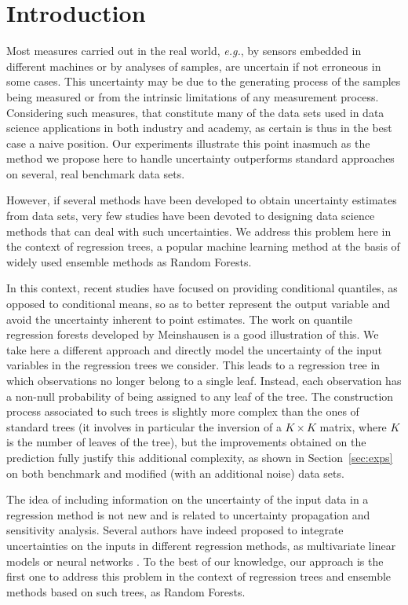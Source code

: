 \documentclass[twoside,11pt]{article}
\begin{document}
\section{Introduction}

Most measures carried out in the real world, \textit{e.g.}, by sensors embedded in different machines or by analyses of samples, are uncertain if not erroneous in some cases. This uncertainty may be due to the generating process of the samples being measured or from the intrinsic limitations of any measurement process. Considering such measures, that constitute many of the data sets used in data science applications in both industry and academy, as certain is thus in the best case a naive position. Our experiments illustrate this point inasmuch as the method we propose here to handle uncertainty outperforms standard approaches on several, real benchmark data sets.

However, if several methods have been developed to obtain uncertainty estimates from data sets, very few studies have been devoted to designing data science methods that can deal with such uncertainties. We address this problem here in the context of regression trees, a popular machine learning method at the basis of widely used ensemble methods as Random Forests.

In this context, recent studies have focused on providing conditional quantiles, as opposed to conditional means, so as to better represent the output variable and avoid the uncertainty inherent to point estimates. The work on quantile regression forests developed by Meinshausen \cite{meinshausen2006quantile} is a good illustration of this. We take here a different approach and directly model the uncertainty of the input variables in the regression trees we consider. This leads to a regression tree in which observations no longer belong to a single leaf. Instead, each observation has a non-null probability of being assigned to any leaf of the tree. The construction process associated to such trees is slightly more complex than the ones of standard trees (it involves in particular the inversion of a $K \times K$ matrix, where $K$ is the number of leaves of the tree), but the improvements obtained on the prediction fully justify this additional complexity, as shown in Section~\ref{sec:exps} on both benchmark and modified (with an additional noise) data sets.

The idea of including information on the uncertainty of the input data in a regression method is not new and is related to uncertainty propagation and sensitivity analysis. Several authors have indeed proposed to integrate uncertainties on the inputs in different regression methods, as multivariate linear models \cite{reis2005} or neural networks \cite{gal2016}. To the best of our knowledge, our approach is the first one to address this problem in the context of regression trees and ensemble methods based on such trees, as Random Forests.
\end{document}
